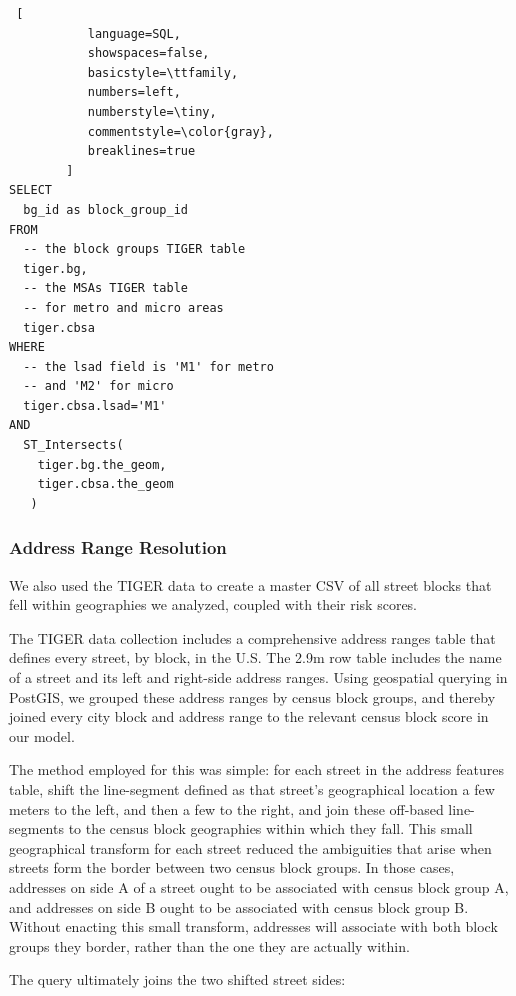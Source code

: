\documentclass{sig-alternate}
\begin{document}
\begin{lstlisting} [
           language=SQL,
           showspaces=false,
           basicstyle=\ttfamily,
           numbers=left,
           numberstyle=\tiny,
           commentstyle=\color{gray},
           breaklines=true
        ]
SELECT 
  bg_id as block_group_id
FROM 
  -- the block groups TIGER table
  tiger.bg, 
  -- the MSAs TIGER table
  -- for metro and micro areas
  tiger.cbsa
WHERE 
  -- the lsad field is 'M1' for metro 
  -- and 'M2' for micro
  tiger.cbsa.lsad='M1'
AND
  ST_Intersects(
    tiger.bg.the_geom,
    tiger.cbsa.the_geom
   )
\end{lstlisting}

\subsubsection{Address Range Resolution}

We also used the TIGER data to create a master CSV of all street blocks that fell within geographies we analyzed, coupled with their risk scores.

The TIGER data collection includes a comprehensive address ranges table that defines every street, by block, in the U.S. The 2.9m row table includes the name of a street and its left and right-side address ranges. Using geospatial querying in PostGIS, we grouped these address ranges by census block groups, and thereby joined every city block and address range to the relevant census block score in our model. 

The method employed for this was simple: for each street in the address features table, shift the line-segment defined as that street's geographical location a few meters to the left, and then a few to the right, and join these off-based line-segments to the census block geographies within which they fall. This small geographical transform for each street reduced the ambiguities that arise when streets form the border between two census block groups. In those cases, addresses on side A of a street ought to be associated with census block group A, and addresses on side B ought to be associated with census block group B. Without enacting this small transform, addresses will associate with both block groups they border, rather than the one they are actually within.

The query ultimately joins the two shifted street sides:
\end{document}
